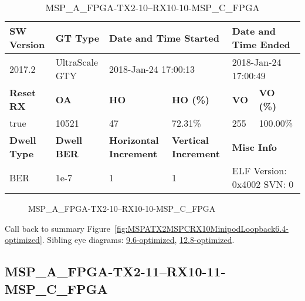 \begin{table}[h]
\centering
\caption{MSP\_A\_FPGA-TX2-10--RX10-10-MSP\_C\_FPGA}
\label{tab:MSPAFPGATX210RX1010MSPCFPGA6.4-optimized}
\begin{tabular}{@{}|l|l|l|l|l|l|@{}}
\toprule
\textbf{SW Version}                & \textbf{GT Type}   & \multicolumn{2}{l|}{\textbf{Date and Time Started}}            & \multicolumn{2}{l|}{\textbf{Date and Time Ended}}        \\ \midrule
2017.2                       & UltraScale GTY          & \multicolumn{2}{l|}{2018-Jan-24 17:00:13}                   & \multicolumn{2}{l|}{2018-Jan-24 17:00:49}               \\ \midrule
\textbf{Reset RX}                  & \textbf{OA} & \textbf{HO}   & \textbf{HO (\%)} & \textbf{VO} & \textbf{VO (\%)} \\ \midrule
true & 10521        & 47          & 72.31\%        & 255        & 100.00\%       \\ \midrule
\textbf{Dwell Type}                & \textbf{Dwell BER} & \textbf{Horizontal Increment} & \textbf{Vertical Increment}    & \multicolumn{2}{l|}{\textbf{Misc Info}}                  \\ \midrule
BER                            & 1e-7        & 1        & 1           & \multicolumn{2}{l|}{ELF Version: 0x4002 SVN: 0}                         \\ \bottomrule
\end{tabular}
\end{table}

\begin{figure}[h]
\caption{MSP\_A\_FPGA-TX2-10--RX10-10-MSP\_C\_FPGA} \label{fig:MSPAFPGATX210RX1010MSPCFPGA6.4-optimized}
\end{figure}

Call back to summary Figure~\ref{fig:MSPATX2MSPCRX10MinipodLoopback6.4-optimized}.
Sibling eye diagrams: \hyperref[sec:MSPAFPGATX210RX1010MSPCFPGA9.6-optimized]{9.6-optimized}, \hyperref[sec:MSPAFPGATX210RX1010MSPCFPGA12.8-optimized]{12.8-optimized}.

\clearpage
\newpage


\subsection{MSP\_A\_FPGA-TX2-11--RX10-11-MSP\_C\_FPGA}\label{sec:MSPAFPGATX211RX1011MSPCFPGA6.4-optimized}

